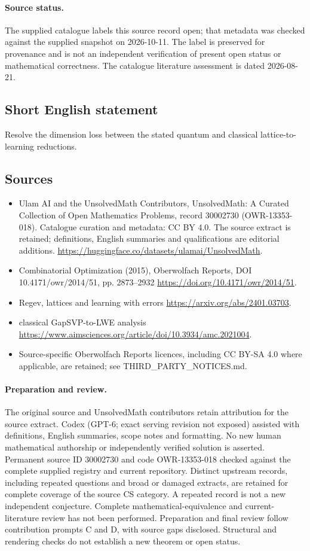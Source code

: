 \documentclass[11pt]{article}
\begin{document}
\paragraph{Source status.}
The supplied catalogue labels this source record open; that metadata was checked against the supplied snapshot on 2026-10-11. The label is preserved for provenance and is not an independent verification of present open status or mathematical correctness. The catalogue literature assessment is dated 2026-08-21.
\subsection{Short English statement}
Resolve the dimension loss between the stated quantum and classical lattice-to-learning reductions.
\subsection{Sources}
\begin{itemize}
\item[\hypertarget{source:30002730:1}{S1}] Ulam AI and the UnsolvedMath Contributors, UnsolvedMath: A Curated Collection of Open Mathematics Problems, record 30002730 (OWR-13353-018). Catalogue curation and metadata: CC BY 4.0. The source extract is retained; definitions, English summaries and qualifications are editorial additions.
\url{https://huggingface.co/datasets/ulamai/UnsolvedMath}.
\item[\hypertarget{source:30002730:2}{S2}] Combinatorial Optimization (2015), Oberwolfach Reports, DOI 10.4171/owr/2014/51, pp. 2873--2932
\url{https://doi.org/10.4171/owr/2014/51}.
\item[\hypertarget{source:30002730:3}{S3}] Regev, lattices and learning with errors
\url{https://arxiv.org/abs/2401.03703}.
\item[\hypertarget{source:30002730:4}{S4}] classical GapSVP-to-LWE analysis
\url{https://www.aimsciences.org/article/doi/10.3934/amc.2021004}.
\item Source-specific Oberwolfach Reports licences, including CC BY-SA 4.0 where applicable, are retained; see THIRD\_PARTY\_NOTICES.md.
\end{itemize}
\paragraph{Preparation and review.}
The original source and UnsolvedMath contributors retain attribution for the source extract. Codex (GPT-6; exact serving revision not exposed) assisted with definitions, English summaries, scope notes and formatting. No new human mathematical authorship or independently verified solution is asserted. Permanent source ID 30002730 and code OWR-13353-018 checked against the complete supplied registry and current repository. Distinct upstream records, including repeated questions and broad or damaged extracts, are retained for complete coverage of the source CS category. A repeated record is not a new independent conjecture. Complete mathematical-equivalence and current-literature review has not been performed. Preparation and final review follow contribution prompts C and D, with source gaps disclosed. Structural and rendering checks do not establish a new theorem or open status.
\label{end:30002730}
\end{document}
